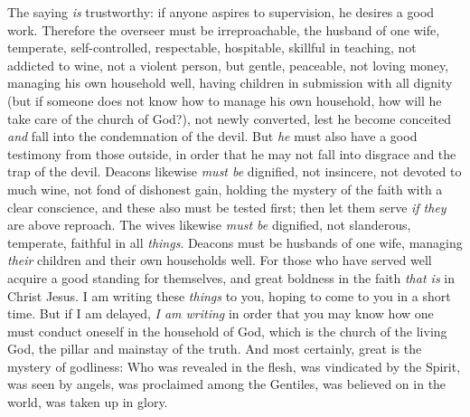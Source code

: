 \begin{biblechapter} %
 The saying \textit{is} trustworthy: if anyone aspires to supervision, he desires a good work.
\verse Therefore the overseer must be irreproachable, the husband of one wife, temperate, self-controlled, respectable, hospitable, skillful in teaching,
\verse not addicted to wine, not a violent person, but gentle, peaceable, not loving money,
\verse managing his own household well, having children in submission with all dignity
\verse (but if someone does not know how to manage his own household, how will he take care of the church of God?),
\verse not newly converted, lest he become conceited \textit{and} fall into the condemnation of the devil.
\verse But \textit{he} must also have a good testimony from those outside, in order that he may not fall into disgrace and the trap of the devil.
 Deacons likewise \textit{must be} dignified, not insincere, not devoted to much wine, not fond of dishonest gain,
\verse holding the mystery of the faith with a clear conscience,
\verse and these also must be tested first; then let them serve \textit{if they} are above reproach.
\verse The wives likewise \textit{must be} dignified, not slanderous, temperate, faithful in all \textit{things}.
\verse Deacons must be husbands of one wife, managing \textit{their} children and their own households well.
\verse For those who have served well acquire a good standing for themselves, and great boldness in the faith \textit{that is} in Christ Jesus.
 I am writing these \textit{things} to you, hoping to come to you in a short time.
\verse But if I am delayed, \textit{I am writing} in order that you may know how one must conduct oneself in the household of God, which is the church of the living God, the pillar and mainstay of the truth.
\verse And most certainly, great is the mystery of godliness: Who was revealed in the flesh, 
was vindicated by the Spirit, 
was seen by angels, 
was proclaimed among the Gentiles, 
was believed on in the world, 
was taken up in glory.
\end{biblechapter}

